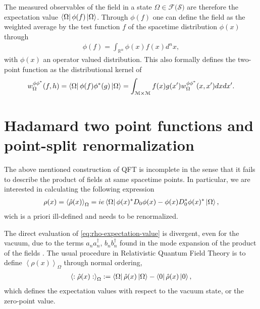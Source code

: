 The measured observables of the field in a state $\Omega \in \mathcal{F}(\mathcal{S)}$ are therefore the expectation value $ \bra{\Omega} \phi(f) \ket{\Omega}$.
Through $\phi(f)$ one can define the field as the weighted average by the test function $f$ of the spacetime distribution $\phi(x)$ through 
\begin{align}
	\phi (f) = \int_{\mathbb{R}^{n}}^{} \phi(x) f(x) d^{n}x,
\end{align}
with $\phi(x)$ an operator valued distribution.
This also formally defines the two-point function as the distributional kernel of
\begin{align}
	w^{\phi\phi^*}_\Omega(f, h) 
	= \bra{\Omega} \phi(f)\phi^*(g) \ket{\Omega}  
	= \int_{\mathcal{M}\times \mathcal{M}}  f(x) g(x') w^{\phi\phi^*}_\Omega(x, x') dx dx'.
	\label{eq:two-point-function-formal-definition}
\end{align}


\section{Hadamard two point functions and point-split renormalization}
\label{sec:Hadamard}
The above mentioned construction of QFT is incomplete in the sense that it fails to describe the product of fields at same spacetime points. In particular, we are interested in calculating the following expression
\begin{align}
	\rho(x) = \left<\hat{\rho}(x) \right>_\Omega= ie\bra{\Omega} \phi(x)^* D_0\phi(x) - \phi(x) D_0^* \phi(x)^* \ket{\Omega},
	\label{eq:rho-expectation-value}
\end{align}
wich is a priori ill-defined and needs to be renormalized.

The direct evaluation of \eqref{eq:rho-expectation-value} is divergent, even for the vacuum, due to the terms $a_n a^\dagger_n$, $b_n b_n^\dagger$ found in the mode expansion of the product of the fields . The usual procedure in Relativistic Quantum Field Theory is to define $\left<\rho(x) \right>_\Omega$ through normal ordering,
\begin{align}
	\left<:\hat{\rho}(x) :\right>_\Omega:= \bra{\Omega} \hat{\rho}(x) \ket{\Omega} - \bra{0} \hat{\rho}(x) \ket{0},
\end{align}
which defines the expectation values with respect to the vacuum state, or the zero-point value.

